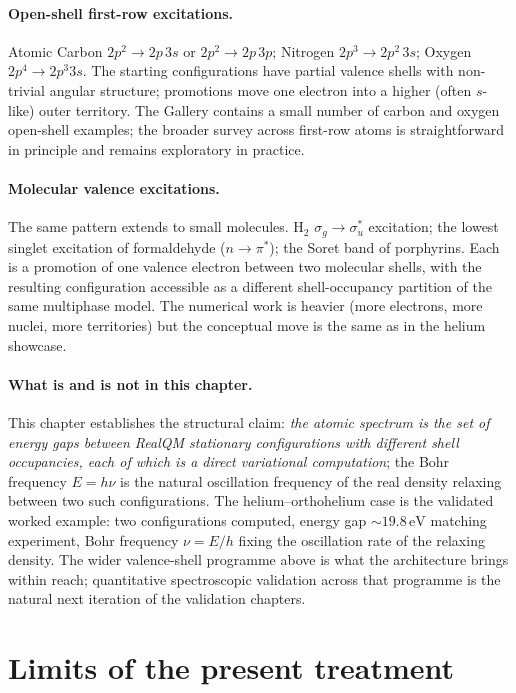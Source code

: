 \paragraph{Open-shell first-row excitations.}
Atomic Carbon $2p^2 \to 2p\,3s$ or $2p^2 \to 2p\,3p$; Nitrogen $2p^3 \to 2p^2\, 3s$; Oxygen $2p^4 \to 2p^3 3s$. The starting configurations have partial valence shells with non-trivial angular structure; promotions move one electron into a higher (often $s$-like) outer territory. The Gallery contains a small number of carbon and oxygen open-shell examples; the broader survey across first-row atoms is straightforward in principle and remains exploratory in practice.

\paragraph{Molecular valence excitations.}
The same pattern extends to small molecules. H$_2$ $\sigma_g \to \sigma_u^*$ excitation; the lowest singlet excitation of formaldehyde ($n \to \pi^*$); the Soret band of porphyrins. Each is a promotion of one valence electron between two molecular shells, with the resulting configuration accessible as a different shell-occupancy partition of the same multiphase model. The numerical work is heavier (more electrons, more nuclei, more territories) but the conceptual move is the same as in the helium showcase.

\paragraph{What is and is not in this chapter.}
This chapter establishes the structural claim: \emph{the atomic spectrum is the set of energy gaps between RealQM stationary configurations with different shell occupancies, each of which is a direct variational computation}; the Bohr frequency $E = h\nu$ is the natural oscillation frequency of the real density relaxing between two such configurations. The helium--orthohelium case is the validated worked example: two configurations computed, energy gap $\sim 19.8\,\mathrm{eV}$ matching experiment, Bohr frequency $\nu = E / h$ fixing the oscillation rate of the relaxing density. The wider valence-shell programme above is what the architecture brings within reach; quantitative spectroscopic validation across that programme is the natural next iteration of the validation chapters.

\section{Limits of the present treatment}\label{sec:excited-limits}

